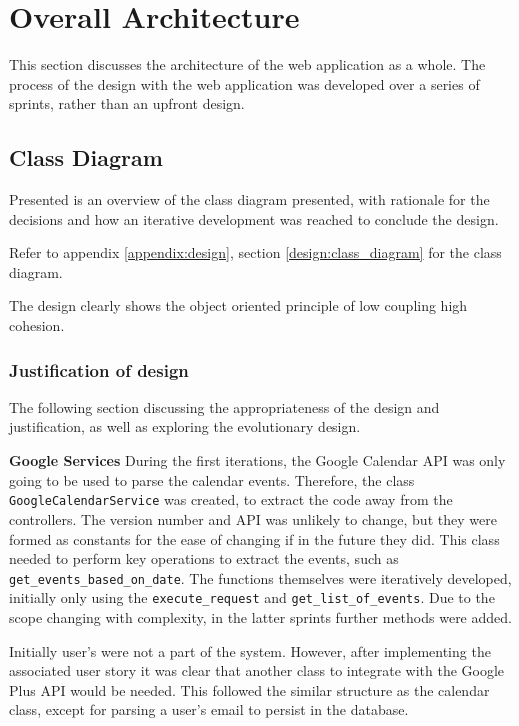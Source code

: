 \section{Overall Architecture}
This section discusses the architecture of the web application as a whole. The process of the design with the web application was developed over a series of sprints, rather than an upfront design.

\subsection{Class Diagram}
\label{architecture:class}
Presented is an overview of the class diagram presented, with rationale for the decisions and how an iterative development was reached to conclude the design.

Refer to appendix \ref{appendix:design}, section \ref{design:class_diagram} for the class diagram.

The design clearly shows the object oriented principle of low coupling high cohesion.

\subsubsection{Justification of design}
The following section discussing the appropriateness of the design and justification, as well as exploring the evolutionary design.

\textbf{Google Services}
During the first iterations, the Google Calendar API was only going to be used to parse the calendar events. Therefore, the class \texttt{GoogleCalendarService} was created, to extract the code away from the controllers. The version number and API was unlikely to change, but they were formed as constants for the ease of changing if in the future they did. This class needed to perform key operations to extract the events, such as \texttt{get\_events\_based\_on\_date}. The functions themselves were iteratively developed, initially only using the \texttt{execute\_request} and \texttt{get\_list\_of\_events}. Due to the scope changing with complexity, in the latter sprints  further methods were added.

Initially user's were not a part of the system. However, after implementing the associated user story it was clear that another class to integrate with the Google Plus API would be needed. This followed the similar structure as the calendar class, except for parsing a user's email to persist in the database.

